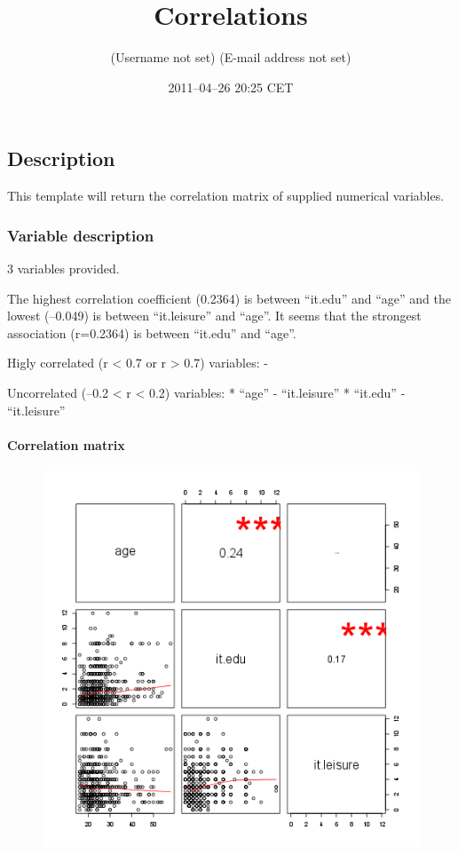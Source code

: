 \documentclass{article}
\title{Correlations}
\author{(Username not set) (E-mail address not set)}
\date{2011--04--26 20:25 CET}
\makeatletter
\def\maxwidth{\ifdim\Gin@nat@width>\linewidth\linewidth
\else\Gin@nat@width\fi}
\let\Oldincludegraphics\includegraphics
\renewcommand{\includegraphics}[1]{\Oldincludegraphics[width=\maxwidth]{#1}}
\makeatother
\begin{document}
\maketitle

\subsection{Description}

This template will return the correlation matrix of supplied numerical
variables.

\subsubsection{Variable description}

3 variables provided.

The highest correlation coefficient (0.2364) is between ``it.edu'' and
``age'' and the lowest (--0.049) is between ``it.leisure'' and ``age''.
It seems that the strongest association (r=0.2364) is between ``it.edu''
and ``age''.

Higly correlated (r \textless{} 0.7 or r \textgreater{} 0.7) variables:
-

Uncorrelated (--0.2 \textless{} r \textless{} 0.2) variables: * ``age''
- ``it.leisure'' * ``it.edu'' - ``it.leisure''

\paragraph{Correlation matrix}

\begin{figure}[htbp]
\centering
\includegraphics{7abdf648965ac14c778c4d61dddc7023.png}
\caption{}
\end{figure}
\end{document}
